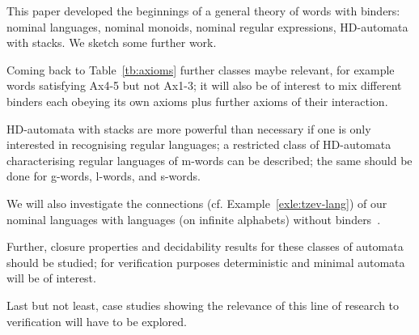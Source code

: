 \documentclass[runningheads,a4paper]{llncs}
\begin{document}
This paper developed the beginnings of a general theory of words with
binders: nominal languages, nominal monoids, nominal regular
expressions, HD-automata with stacks. We sketch some further work.

Coming back to Table~\ref{tb:axioms} further classes maybe relevant,
for example words satisfying Ax4-5 but not Ax1-3; it will also be of
interest to mix different binders each obeying its own axioms plus
further axioms of their interaction.

HD-automata with stacks are more powerful than necessary if one is
only interested in recognising regular languages; a restricted class
of HD-automata characterising regular languages of m-words can be
described; the same should be done for g-words, l-words, and s-words.

We will also investigate the connections (cf.
Example~\ref{exle:tzev-lang}) of our nominal languages with languages
(on infinite alphabets) without binders~\cite{bojanczyk:stacs11,tze11,gabbayciancia,ct09}.


Further, closure properties and decidability results for these classes
of automata should be studied; for verification purposes deterministic
and minimal automata will be of interest. 

Last but not least, case studies showing the relevance of this line of
research to verification will have to be explored.
\end{document}
